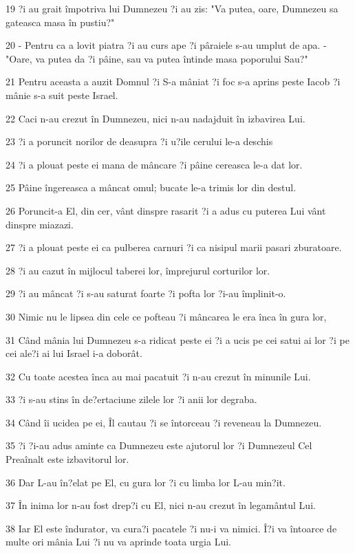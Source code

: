 \par 19 ?i au grait împotriva lui Dumnezeu ?i au zis: "Va putea, oare, Dumnezeu sa gateasca masa în pustiu?"
\par 20 - Pentru ca a lovit piatra ?i au curs ape ?i pâraiele s-au umplut de apa. - "Oare, va putea da ?i pâine, sau va putea întinde masa poporului Sau?"
\par 21 Pentru aceasta a auzit Domnul ?i S-a mâniat ?i foc s-a aprins peste Iacob ?i mânie s-a suit peste Israel.
\par 22 Caci n-au crezut în Dumnezeu, nici n-au nadajduit în izbavirea Lui.
\par 23 ?i a poruncit norilor de deasupra ?i u?ile cerului le-a deschis
\par 24 ?i a plouat peste ei mana de mâncare ?i pâine cereasca le-a dat lor.
\par 25 Pâine îngereasca a mâncat omul; bucate le-a trimis lor din destul.
\par 26 Poruncit-a El, din cer, vânt dinspre rasarit ?i a adus cu puterea Lui vânt dinspre miazazi.
\par 27 ?i a plouat peste ei ca pulberea carnuri ?i ca nisipul marii pasari zburatoare.
\par 28 ?i au cazut în mijlocul taberei lor, împrejurul corturilor lor.
\par 29 ?i au mâncat ?i s-au saturat foarte ?i pofta lor ?i-au împlinit-o.
\par 30 Nimic nu le lipsea din cele ce pofteau ?i mâncarea le era înca în gura lor,
\par 31 Când mânia lui Dumnezeu s-a ridicat peste ei ?i a ucis pe cei satui ai lor ?i pe cei ale?i ai lui Israel i-a doborât.
\par 32 Cu toate acestea înca au mai pacatuit ?i n-au crezut în minunile Lui.
\par 33 ?i s-au stins în de?ertaciune zilele lor ?i anii lor degraba.
\par 34 Când îi ucidea pe ei, Îl cautau ?i se întorceau ?i reveneau la Dumnezeu.
\par 35 ?i ?i-au adus aminte ca Dumnezeu este ajutorul lor ?i Dumnezeul Cel Preaînalt este izbavitorul lor.
\par 36 Dar L-au în?elat pe El, cu gura lor ?i cu limba lor L-au min?it.
\par 37 În inima lor n-au fost drep?i cu El, nici n-au crezut în legamântul Lui.
\par 38 Iar El este îndurator, va cura?i pacatele ?i nu-i va nimici. Î?i va întoarce de multe ori mânia Lui ?i nu va aprinde toata urgia Lui.
